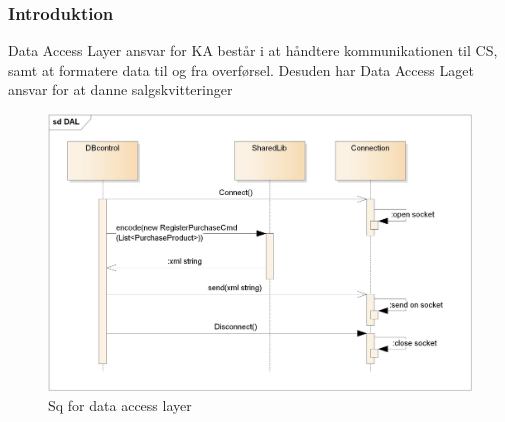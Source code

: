 \subsubsection{Introduktion}

Data Access Layer ansvar for \gls{KA} består i at håndtere kommunikationen til \gls{CS}, samt at formatere data til og fra overførsel. Desuden har Data Access Laget ansvar for at danne salgskvitteringer

\begin{figure}[H]
    \centering
    \includegraphics[width=120mm]{Systemdesign/Frontend/DAL/Pics/SQ}
    \caption{Sq for data access layer}
    \label{fig:sqkdal}
\end{figure}


